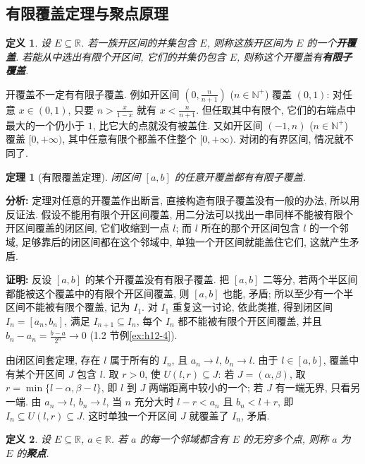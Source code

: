 \documentclass[UTF8,openany]{ctexbook}
\theoremstyle{chinesetextbook}
\newtheorem{definition}{定义}[section]
\newtheorem{theorem}{定理}[section]
\newenvironment{cnproof}{\par\indent\textbf{证明:} \ignorespaces}{\par}
\begin{document}
\subsection{有限覆盖定理与聚点原理}
\begin{definition}
设 $E\subseteq\mathbb R$. 若一族开区间的并集包含 $E$, 则称这族开区间为 $E$ 的一个\textbf{开覆盖}. 若能从中选出有限个开区间, 它们的并集仍包含 $E$, 则称这个开覆盖有\textbf{有限子覆盖}.
\end{definition}
开覆盖不一定有有限子覆盖. 例如开区间 $\displaystyle\left(0,\frac n{n+1}\right)$ ($n\in\mathbb N^+$) 覆盖 $(0,1)$: 对任意 $x\in(0,1)$, 只要 $\displaystyle n>\frac x{1-x}$ 就有 $\displaystyle x<\frac n{n+1}$. 但任取其中有限个, 它们的右端点中最大的一个仍小于 $1$, 比它大的点就没有被盖住. 又如开区间 $(-1,n)$ ($n\in\mathbb N^+$) 覆盖 $[0,+\infty)$, 其中任意有限个都盖不住整个 $[0,+\infty)$. 对闭的有界区间, 情况就不同了.
\begin{theorem}[有限覆盖定理]
闭区间 $[a,b]$ 的任意开覆盖都有有限子覆盖.
\end{theorem}
\par\indent\textbf{分析:} 定理对任意的开覆盖作出断言, 直接构造有限子覆盖没有一般的办法, 所以用反证法. 假设不能用有限个开区间覆盖, 用二分法可以找出一串同样不能被有限个开区间覆盖的闭区间, 它们收缩到一点 $l$; 而 $l$ 所在的那个开区间包含 $l$ 的一个邻域, 足够靠后的闭区间都在这个邻域中, 单独一个开区间就能盖住它们, 这就产生矛盾.
\begin{cnproof}
反设 $[a,b]$ 的某个开覆盖没有有限子覆盖. 把 $[a,b]$ 二等分, 若两个半区间都能被这个覆盖中的有限个开区间覆盖, 则 $[a,b]$ 也能, 矛盾; 所以至少有一个半区间不能被有限个覆盖, 记为 $I_1$. 对 $I_1$ 重复这一讨论, 依此类推, 得到闭区间 $I_n=[a_n,b_n]$, 满足 $I_{n+1}\subseteq I_n$, 每个 $I_n$ 都不能被有限个开区间覆盖, 并且 $\displaystyle b_n-a_n=\frac{b-a}{2^n}\to0$ (1.2 节例\ref{ex:h12-4}).

由闭区间套定理, 存在 $l$ 属于所有的 $I_n$, 且 $a_n\to l$, $b_n\to l$. 由于 $l\in[a,b]$, 覆盖中有某个开区间 $J$ 包含 $l$. 取 $r>0$, 使 $U(l,r)\subseteq J$: 若 $J=(\alpha,\beta)$, 取 $r=\min\{l-\alpha,\beta-l\}$, 即 $l$ 到 $J$ 两端距离中较小的一个; 若 $J$ 有一端无界, 只看另一端. 由 $a_n\to l$, $b_n\to l$, 当 $n$ 充分大时 $l-r<a_n$ 且 $b_n<l+r$, 即 $I_n\subseteq U(l,r)\subseteq J$. 这时单独一个开区间 $J$ 就覆盖了 $I_n$, 矛盾.
\end{cnproof}
\begin{definition}
设 $E\subseteq\mathbb R$, $a\in\mathbb R$. 若 $a$ 的每一个邻域都含有 $E$ 的无穷多个点, 则称 $a$ 为 $E$ 的\textbf{聚点}.
\end{definition}
\end{document}
